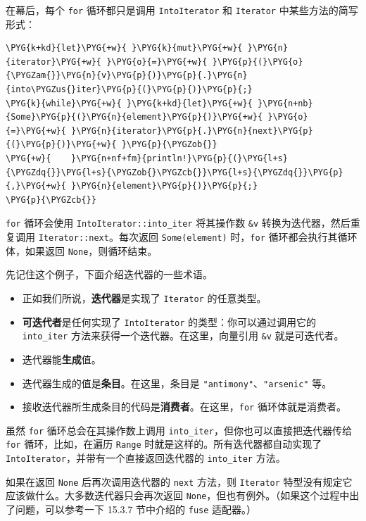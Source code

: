 在幕后，每个 \texttt{for} 循环都只是调用 \texttt{IntoIterator} 和 \texttt{Iterator} 中某些方法的简写形式：

\begin{Verbatim}[commandchars=\\\{\},breaklines=true,breakanywhere=true,fontsize=\codefont,xleftmargin=17bp]
\PYG{k+kd}{let}\PYG{+w}{ }\PYG{k}{mut}\PYG{+w}{ }\PYG{n}{iterator}\PYG{+w}{ }\PYG{o}{=}\PYG{+w}{ }\PYG{p}{(}\PYG{o}{\PYGZam{}}\PYG{n}{v}\PYG{p}{)}\PYG{p}{.}\PYG{n}{into\PYGZus{}iter}\PYG{p}{(}\PYG{p}{)}\PYG{p}{;}
\PYG{k}{while}\PYG{+w}{ }\PYG{k+kd}{let}\PYG{+w}{ }\PYG{n+nb}{Some}\PYG{p}{(}\PYG{n}{element}\PYG{p}{)}\PYG{+w}{ }\PYG{o}{=}\PYG{+w}{ }\PYG{n}{iterator}\PYG{p}{.}\PYG{n}{next}\PYG{p}{(}\PYG{p}{)}\PYG{+w}{ }\PYG{p}{\PYGZob{}}
\PYG{+w}{    }\PYG{n+nf+fm}{println!}\PYG{p}{(}\PYG{l+s}{\PYGZdq{}}\PYG{l+s}{\PYGZob{}\PYGZcb{}}\PYG{l+s}{\PYGZdq{}}\PYG{p}{,}\PYG{+w}{ }\PYG{n}{element}\PYG{p}{)}\PYG{p}{;}
\PYG{p}{\PYGZcb{}}
\end{Verbatim}

\texttt{for} 循环会使用 \texttt{IntoIterator::into\_iter} 将其操作数 \texttt{\&v} 转换为迭代器，然后重复调用 \texttt{Iterator::next}。每次返回 \texttt{Some(element)} 时，\texttt{for} 循环都会执行其循环体，如果返回 \texttt{None}，则循环结束。

先记住这个例子，下面介绍迭代器的一些术语。

\begin{itemize}
\item 正如我们所说，\textbf{迭代器}是实现了 \texttt{Iterator} 的任意类型。
\item \textbf{可迭代者}是任何实现了 \texttt{IntoIterator} 的类型：你可以通过调用它的 \texttt{into\_iter} 方法来获得一个迭代器。在这里，向量引用 \texttt{\&v} 就是可迭代者。
\item 迭代器能\textbf{生成}值。
\item 迭代器生成的值是\textbf{条目}。在这里，条目是 \texttt{"antimony"}、\texttt{"arsenic"} 等。
\item 接收迭代器所生成条目的代码是\textbf{消费者}。在这里，\texttt{for} 循环体就是消费者。
\end{itemize}

虽然 \texttt{for} 循环总会在其操作数上调用 \texttt{into\_iter}，但你也可以直接把迭代器传给 \texttt{for} 循环，比如，在遍历 \texttt{Range} 时就是这样的。所有迭代器都自动实现了 \texttt{IntoIterator}，并带有一个直接返回迭代器的 \texttt{into\_iter} 方法。

如果在返回 \texttt{None} 后再次调用迭代器的 \texttt{next} 方法，则 \texttt{Iterator} 特型没有规定它应该做什么。大多数迭代器只会再次返回 \texttt{None}，但也有例外。（如果这个过程中出了问题，可以参考一下 15.3.7 节中介绍的 \texttt{fuse} 适配器。）

